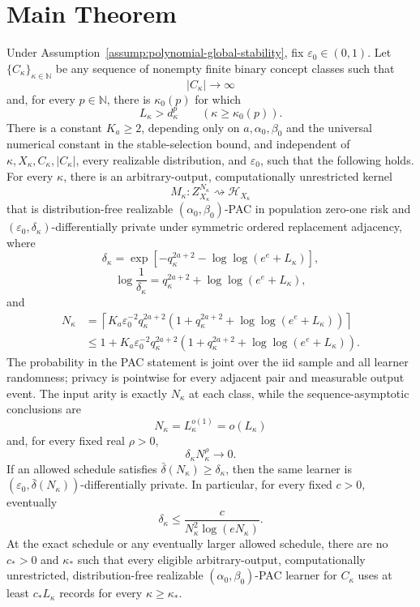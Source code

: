 \section{Main Theorem}\label{sec:main}

\begin{theorem}
\label{thm:main}
Under Assumption~\ref{assump:polynomial-global-stability}, fix
\(\varepsilon_0\in(0,1)\).  Let
\(\{C_\kappa\}_{\kappa\in\mathbb N}\) be any sequence of nonempty
finite binary concept classes such that
\[
|C_\kappa|\to\infty
\]
and, for every \(p\in\mathbb N\), there is \(\kappa_0(p)\) for which
\[
L_\kappa>d_\kappa^p
\qquad(\kappa\geq\kappa_0(p)).
\]
There is a constant \(K_a\geq2\), depending only on
\(a,\alpha_0,\beta_0\) and the universal numerical constant in the
stable-selection bound, and independent of
\(\kappa,X_\kappa,C_\kappa,|C_\kappa|\), every realizable
distribution, and \(\varepsilon_0\), such that the following holds.
For every \(\kappa\), there is an arbitrary-output,
computationally unrestricted kernel
\[
M_\kappa:
Z_{X_\kappa}^{N_\kappa}
\rightsquigarrow\mathcal H_{X_\kappa}
\]
that is distribution-free realizable
\((\alpha_0,\beta_0)\)-PAC in population zero-one risk and
\((\varepsilon_0,\delta_\kappa)\)-differentially private under
symmetric ordered replacement adjacency, where
\[
\delta_\kappa
=
\exp\!\left[
-q_\kappa^{2a+2}
-\log\log(e^e+L_\kappa)
\right],
\]
\[
\log\frac1{\delta_\kappa}
=q_\kappa^{2a+2}+\log\log(e^e+L_\kappa),
\]
and
\[
\begin{aligned}
N_\kappa
&=
\left\lceil
K_a\varepsilon_0^{-2}q_\kappa^{2a+2}
\left(
1+q_\kappa^{2a+2}
+\log\log(e^e+L_\kappa)
\right)
\right\rceil\\
&\leq
1+K_a\varepsilon_0^{-2}q_\kappa^{2a+2}
\left(
1+q_\kappa^{2a+2}
+\log\log(e^e+L_\kappa)
\right).
\end{aligned}
\]
The probability in the PAC statement is joint over the iid sample
and all learner randomness; privacy is pointwise for every adjacent
pair and measurable output event.  The input arity is exactly
\(N_\kappa\) at each class, while the sequence-asymptotic conclusions
are
\[
N_\kappa=L_\kappa^{o(1)}=o(L_\kappa)
\]
and, for every fixed real \(\rho>0\),
\[
\delta_\kappa N_\kappa^\rho\longrightarrow0.
\]
If an allowed schedule satisfies
\(\bar\delta(N_\kappa)\geq\delta_\kappa\), then the same learner is
\((\varepsilon_0,\bar\delta(N_\kappa))\)-differentially private.
In particular, for every fixed \(c>0\), eventually
\[
\delta_\kappa
\leq\frac{c}{N_\kappa^2\log(eN_\kappa)}.
\]
At the exact schedule or any eventually larger allowed schedule,
there are no \(c_*>0\) and \(\kappa_*\) such that every eligible
arbitrary-output, computationally unrestricted,
distribution-free realizable \((\alpha_0,\beta_0)\)-PAC learner for
\(C_\kappa\) uses at least \(c_*L_\kappa\) records for every
\(\kappa\geq\kappa_*\).


\end{theorem}
